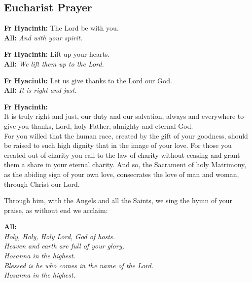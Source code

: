 \documentclass[12pt,landscape]{article}
\begin{document}
\begin{multicols}{2}
\section*{Eucharist Prayer}

\textbf{Fr Hyacinth:} The Lord be with you.\\
\textbf{All:} \textit{And with your spirit.}

\vspace{0.5em}

\textbf{Fr Hyacinth:} Lift up your hearts.\\
\textbf{All:} \textit{We lift them up to the Lord.}

\vspace{0.5em}

\textbf{Fr Hyacinth:} Let us give thanks to the Lord our God.\\
\textbf{All:} \textit{It is right and just.}

\vspace{1em}

\textbf{Fr Hyacinth:}\\
It is truly right and just, our duty and our salvation, always and everywhere to give you thanks, Lord, holy Father, almighty and eternal God.\\

For you willed that the human race, created by the gift of your goodness, should be raised to such high dignity that in the image of your love. For those you created out of charity you call to the law of charity without ceasing and grant them a share in your eternal charity. And so, the Sacrament of holy Matrimony, as the abiding sign of your own love, consecrates the love of man and woman, through Christ our Lord.

Through him, with the Angels and all the Saints, we sing the hymn of your praise, as without end we acclaim:

\vspace{1em}

\textbf{All:}\\
\textit{Holy, Holy, Holy Lord, God of hosts.\\
Heaven and earth are full of your glory,\\
Hosanna in the highest.\\
Blessed is he who comes in the name of the Lord.\\
Hosanna in the highest.}


\end{multicols}
\end{document}
